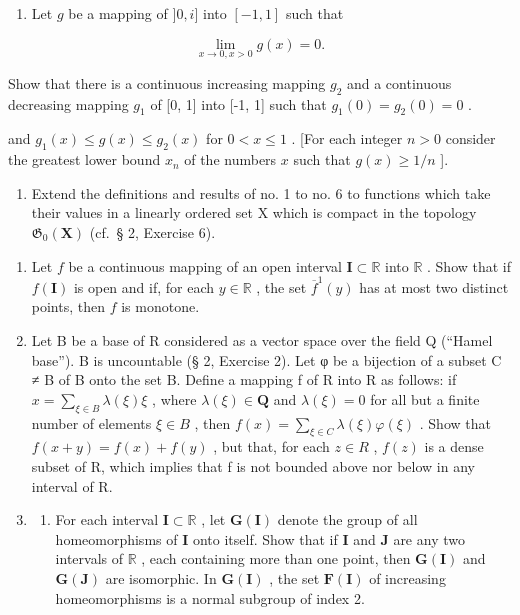 \begin{enumerate}
\def\labelenumi{\arabic{enumi})}
\setcounter{enumi}{16}
\tightlist
\item
  Let \(g\) be a mapping of \(]0, i]\) into \([-1, 1]\) such that
\end{enumerate}

\[
\lim _ {x \rightarrow 0, x > 0} g (x) = 0.
\]

Show that there is a continuous increasing mapping \(g_{2}\) and a continuous decreasing mapping \(g_{1}\) of {[}0, 1{]} into {[}-1, 1{]} such that \(g_{1}(0) = g_{2}(0) = 0\) .

and \(g_{1}(x) \leqslant g(x) \leqslant g_{2}(x)\) for \(0 < x \leqslant 1\) . {[}For each integer \(n > 0\) consider the greatest lower bound \(x_{n}\) of the numbers \(x\) such that \(g(x) \geqslant 1 / n\) {]}.

\begin{enumerate}
\def\labelenumi{\arabic{enumi})}
\setcounter{enumi}{17}
\tightlist
\item
  Extend the definitions and results of no. 1 to no. 6 to functions which take their values in a linearly ordered set X which is compact in the topology \(\mathfrak{G}_{0}(\mathbf{X})\) (cf.~§ 2, Exercise 6).
\end{enumerate}

\BourbakiExerciseGroup

\begin{enumerate}
\def\labelenumi{\arabic{enumi})}
\item
  Let \(f\) be a continuous mapping of an open interval \(\mathbf{I} \subset \mathbb{R}\) into \(\mathbb{R}\) . Show that if \(f(\mathbf{I})\) is open and if, for each \(y \in \mathbb{R}\) , the set \(\overline{f}^1(y)\) has at most two distinct points, then \(f\) is monotone.
\item
  Let B be a base of R considered as a vector space over the field Q (``Hamel base''). B is uncountable (§ 2, Exercise 2). Let φ be a bijection of a subset C ≠ B of B onto the set B. Define a mapping f of R into R as follows: if \(x = \sum_{\xi \in B} \lambda(\xi) \xi\) , where \(\lambda(\xi) \in \mathbf{Q}\) and \(\lambda(\xi) = 0\) for all but a finite number of elements \(\xi \in B\) , then \(f(x) = \sum_{\xi \in C} \lambda(\xi) \varphi(\xi)\) . Show that \(f(x + y) = f(x) + f(y)\) , but that, for each \(z \in R\) , \(f(z)\) is a dense subset of R, which implies that f is not bounded above nor below in any interval of R.
\item
  \begin{enumerate}
  \def\labelenumii{\alph{enumii})}
  \tightlist
  \item
    For each interval \(\mathbf{I} \subset \mathbb{R}\) , let \(\mathbf{G}(\mathbf{I})\) denote the group of all homeomorphisms of \(\mathbf{I}\) onto itself. Show that if \(\mathbf{I}\) and \(\mathbf{J}\) are any two intervals of \(\mathbb{R}\) , each containing more than one point, then \(\mathbf{G}(\mathbf{I})\) and \(\mathbf{G}(\mathbf{J})\) are isomorphic. In \(\mathbf{G}(\mathbf{I})\) , the set \(\mathbf{F}(\mathbf{I})\) of increasing homeomorphisms is a normal subgroup of index 2.
  \end{enumerate}
\end{enumerate}

